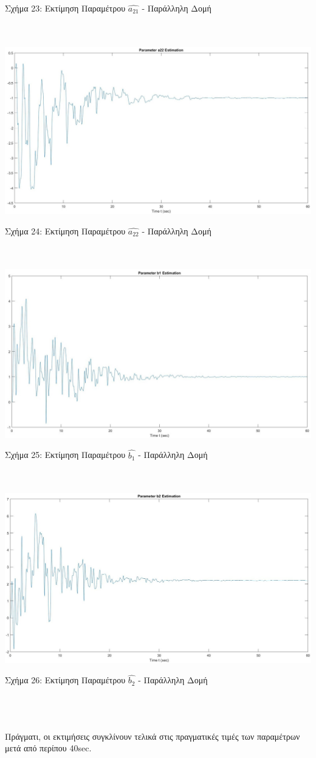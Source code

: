 \documentclass[12pt]{article}
\begin{document}
\centerline{Σχήμα 23: Εκτίμηση Παραμέτρου $\hat{a_{21}}$ - Παράλληλη Δομή}
\\ \\
\includegraphics[width=\linewidth]{a22_estim_3.jpg}
\centerline{Σχήμα 24: Εκτίμηση Παραμέτρου $\hat{a_{22}}$ - Παράλληλη Δομή}
\\ \\
\includegraphics[width=\linewidth]{b1_estim_3.jpg}
\centerline{Σχήμα 25: Εκτίμηση Παραμέτρου $\hat{b_1}$ - Παράλληλη Δομή}
\\ \\
\includegraphics[width=\linewidth]{b2_estim_3.jpg}
\centerline{Σχήμα 26: Εκτίμηση Παραμέτρου $\hat{b_2}$ - Παράλληλη Δομή}
\\ \\ \\
Πράγματι, οι εκτιμήσεις συγκλίνουν τελικά στις πραγματικές τιμές των παραμέτρων μετά από περίπου 40sec.
\end{document}
